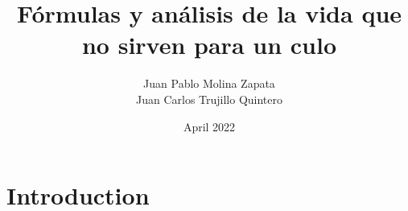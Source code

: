 \documentclass{article}
\title{Fórmulas y análisis de la vida que no sirven para un culo}
\author{Juan Pablo Molina Zapata \\ Juan Carlos Trujillo Quintero}
\date{April 2022}
\begin{document}
\maketitle

\section{Introduction}
\end{document}
